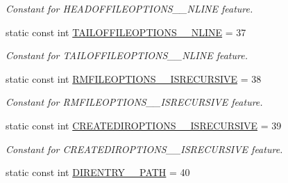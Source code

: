 \begin{DoxyCompactItemize}
\begin{DoxyCompactList}\small\item\em Constant for HEADOFFILEOPTIONS\_\-\_\-NLINE feature. \item\end{DoxyCompactList}\item 
\hypertarget{classFMS__Data_1_1FMS__DataPackage_a5d3d1537dd724de10bfdc62748fed8d8}{
static const int \hyperlink{classFMS__Data_1_1FMS__DataPackage_a5d3d1537dd724de10bfdc62748fed8d8}{TAILOFFILEOPTIONS\_\-\_\-NLINE} = 37}
\label{classFMS__Data_1_1FMS__DataPackage_a5d3d1537dd724de10bfdc62748fed8d8}

\begin{DoxyCompactList}\small\item\em Constant for TAILOFFILEOPTIONS\_\-\_\-NLINE feature. \item\end{DoxyCompactList}\item 
\hypertarget{classFMS__Data_1_1FMS__DataPackage_a3155d2440baa4c04d43a531781e0921c}{
static const int \hyperlink{classFMS__Data_1_1FMS__DataPackage_a3155d2440baa4c04d43a531781e0921c}{RMFILEOPTIONS\_\-\_\-ISRECURSIVE} = 38}
\label{classFMS__Data_1_1FMS__DataPackage_a3155d2440baa4c04d43a531781e0921c}

\begin{DoxyCompactList}\small\item\em Constant for RMFILEOPTIONS\_\-\_\-ISRECURSIVE feature. \item\end{DoxyCompactList}\item 
\hypertarget{classFMS__Data_1_1FMS__DataPackage_a782439ca78bfce4cf12c7294aed7de4d}{
static const int \hyperlink{classFMS__Data_1_1FMS__DataPackage_a782439ca78bfce4cf12c7294aed7de4d}{CREATEDIROPTIONS\_\-\_\-ISRECURSIVE} = 39}
\label{classFMS__Data_1_1FMS__DataPackage_a782439ca78bfce4cf12c7294aed7de4d}

\begin{DoxyCompactList}\small\item\em Constant for CREATEDIROPTIONS\_\-\_\-ISRECURSIVE feature. \item\end{DoxyCompactList}\item 
\hypertarget{classFMS__Data_1_1FMS__DataPackage_afedbad80778537d8145a82f92e19d8aa}{
static const int \hyperlink{classFMS__Data_1_1FMS__DataPackage_afedbad80778537d8145a82f92e19d8aa}{DIRENTRY\_\-\_\-PATH} = 40}
\label{classFMS__Data_1_1FMS__DataPackage_afedbad80778537d8145a82f92e19d8aa}


\end{DoxyCompactItemize}
